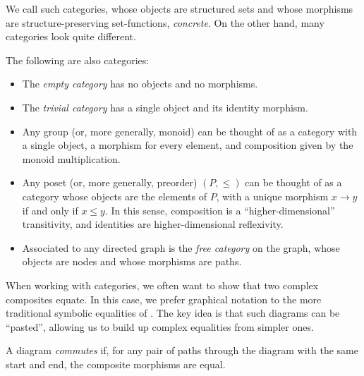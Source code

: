 \noindent
We call such categories, whose objects are structured sets and whose morphisms
are structure-preserving set-functions, \emph{concrete}. On the other hand, many
categories look quite different.

\begin{ex}\label{ex:abstract categories}The following are also categories:
  \begin{itemize}
    \item The \emph{empty category} has no objects and no morphisms.
    \item The \emph{trivial category} has a single object and its identity morphism.
    \item Any group (or, more generally, monoid) can be thought of as a category
      with a single object, a morphism for every element, and composition
      given by the monoid multiplication.
    \item Any poset (or, more generally, preorder) $(P, \leq)$ can be thought
      of as a category whose objects are the elements of $P$, with a unique
      morphism $x\rightarrow y$ if and only if $x\leq y$. In this sense,
      composition is a ``higher-dimensional'' transitivity, and identities are
      higher-dimensional reflexivity.
    \item Associated to any directed graph is the \emph{free category} on the
      graph, whose objects are nodes and whose morphisms are paths.
  \end{itemize}
\end{ex}


\noindent
When working with categories, we often want to show that two complex composites
equate. In this case, we prefer graphical notation to the more traditional
symbolic equalities of . The key idea is that such diagrams
can be ``pasted'', allowing us to build up complex equalities from simpler ones.

\begin{dfn}\label{def:commutative diagram}
  A diagram \emph{commutes} if, for any pair of paths through the
  diagram with the same start and end, the composite morphisms are equal.
\end{dfn}

